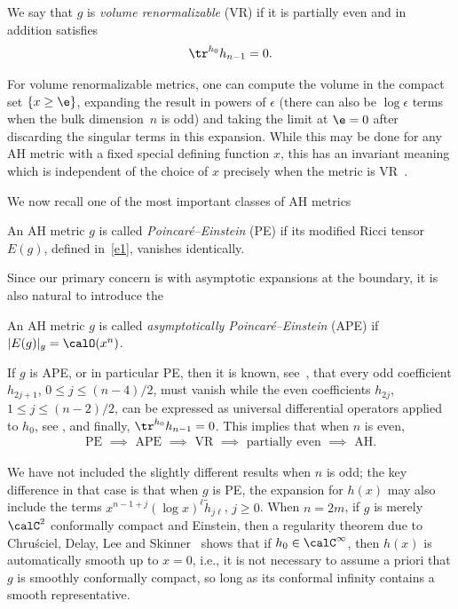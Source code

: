 \begin{Definition}\label{definition1.2}We say that $g$ is \emph{volume renormalizable} (VR) if it is partially even and in addition satisfies
\begin{gather*}%
\tr^{h_0} h_{n-1} = 0.
\end{gather*}
\end{Definition}

For volume renormalizable metrics, one can compute the volume in the compact set $\{x \geq \e\}$, expanding the result in powers of $\epsilon$ (there can also be $\log \epsilon$ terms when the bulk dimen\-sion~$n$ is odd) and taking the limit at $\e = 0$ after discarding the singular terms in this expansion. While this may be done for any AH metric with a fixed special defining function $x$, this has an invariant meaning which is independent of the choice of $x$ precisely when the metric is VR~\cite{Gr}.

We now recall one of the most important classes of AH metrics
\begin{Definition}\label{definition1.3} An AH metric $g$ is called \emph{Poincar\'e--Einstein} (PE) if its modified Ricci tensor~$E(g)$, defined in~\eqref{e1}, vanishes identically.
\end{Definition}
Since our primary concern is with asymptotic expansions at the boundary, it is also natural to introduce the
\begin{Definition}\label{definition1.4}
An AH metric $g$ is called \emph{asymptotically Poincar\'e--Einstein} (APE) if $|E(g)|_{g} = \calO( x^n)$.
\end{Definition}

If $g$ is APE, or in particular PE, then it is known, see~\cite{FG2}, that every odd coefficient $h_{2j+1}$, $0 \leq j \leq (n-4)/2$, must
vanish while the even coefficients $h_{2j}$, $1 \leq j \leq (n-2)/2$, can be expressed as universal differential operators applied
to $h_0$, see \cite{FG2}, and finally, $\tr^{h_0} h_{n-1} = 0$. This implies that when $n$ is even,
\begin{gather*}
	\text{PE $\implies$ APE $\implies$ VR $\implies$ partially even $\implies$ AH.}
\end{gather*}

We have not included the slightly different results when $n$ is odd; the key difference in that case is that when $g$ is PE, the expansion for $h(x)$ may also include the terms $x^{n-1+j} (\log x)^\ell \tilde{h}_{j\ell}$, $j \geq 0$. When $n=2m$, if $g$ is merely $\calC^2$ conformally compact and Einstein, then a regularity theorem due to Chru\'sciel, Delay, Lee and Skinner~\cite{CDLS} shows that if $h_0 \in \calC^\infty$, then $h(x)$ is automatically smooth up to $x=0$, i.e., it is not necessary to assume a priori that $g$ is smoothly conformally compact, so long as its conformal infinity contains a smooth representative.

